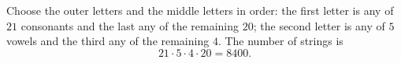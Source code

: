 Choose the outer letters and the middle letters in order: the first letter is any of $21$ consonants and the last any of the remaining $20$; the second letter is any of $5$ vowels and the third any of the remaining $4$. The number of strings is
\[21\cdot5\cdot4\cdot20=\boxed{8400}.\]
